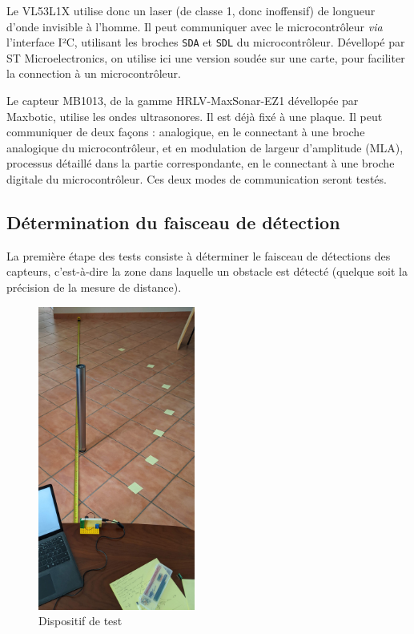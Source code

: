\documentclass[a4paper, 11pt]{article}
\begin{document}
\par Le VL53L1X utilise donc un laser (de classe 1, donc inoffensif) de longueur d'onde invisible à l'homme. Il peut communiquer avec le microcontrôleur \textit{via} l'interface I²C, utilisant les broches \texttt{SDA} et \texttt{SDL} du microcontrôleur. Dévellopé par ST Microelectronics, on utilise ici une version soudée sur une carte, pour faciliter la connection à un microcontrôleur. 

\par Le capteur MB1013, de la gamme HRLV-MaxSonar-EZ1 dévellopée par Maxbotic, utilise les ondes ultrasonores. Il est déjà fixé à une plaque. Il peut communiquer de deux façons : analogique, en le connectant à une broche analogique du microcontrôleur, et en modulation de largeur d'amplitude (MLA), processus détaillé dans la partie correspondante, en le connectant à une broche digitale du microcontrôleur. Ces deux modes de communication seront testés.


\subsection{Détermination du faisceau de détection}

\par La première étape des tests consiste à déterminer le faisceau de détections des capteurs, c'est-à-dire la zone dans laquelle un obstacle est détecté (quelque soit la précision de la mesure de distance).

\begin{figure}[H]
\centering
\includegraphics[height=10cm]{images/faisceau.jpg}
\caption{Dispositif de test}
\end{figure}
\end{document}
